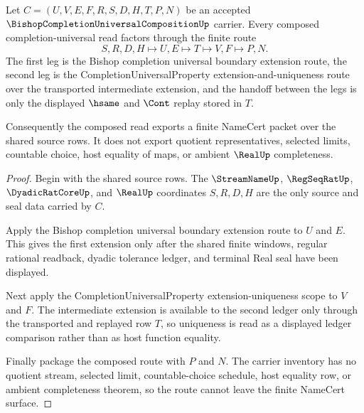 \begin{theorem}
\label{thm:bishop-completion-universal-composition-route}
Let $C=(U,V,E,F,R,S,D,H,T,P,N)$ be an accepted $\BishopCompletionUniversalCompositionUp$ carrier. Every composed completion-universal read factors through the finite route
$$
S,R,D,H \longmapsto U,E \longmapsto T \longmapsto V,F \longmapsto P,N .
$$
The first leg is the Bishop completion universal boundary extension route, the second leg is the CompletionUniversalProperty extension-and-uniqueness route over the transported intermediate extension, and the handoff between the legs is only the displayed $\hsame$ and $\Cont$ replay stored in $T$.

Consequently the composed read exports a finite NameCert packet over the shared source rows. It does not export quotient representatives, selected limits, countable choice, host equality of maps, or ambient $\RealUp$ completeness.
\end{theorem}
\begin{proof}
Begin with the shared source rows. The $\StreamNameUp$, $\RegSeqRatUp$, $\DyadicRatCoreUp$, and $\RealUp$ coordinates $S,R,D,H$ are the only source and seal data carried by $C$.

Apply the Bishop completion universal boundary extension route to $U$ and $E$. This gives the first extension only after the shared finite windows, regular rational readback, dyadic tolerance ledger, and terminal Real seal have been displayed.

Next apply the CompletionUniversalProperty extension-uniqueness scope to $V$ and $F$. The intermediate extension is available to the second ledger only through the transported and replayed row $T$, so uniqueness is read as a displayed ledger comparison rather than as host function equality.

Finally package the composed route with $P$ and $N$. The carrier inventory has no quotient stream, selected limit, countable-choice schedule, host equality row, or ambient completeness theorem, so the route cannot leave the finite NameCert surface.
\end{proof}


